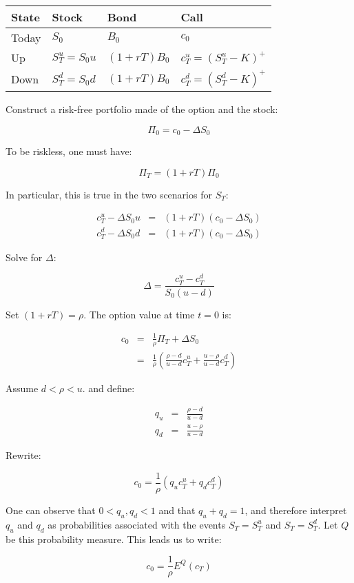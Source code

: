 \documentclass[justified]{tufte-book}
\begin{document}
\begin{longtable}[]{@{}llll@{}}
\toprule
State & Stock & Bond & Call\tabularnewline
\midrule
\endhead
Today & \(S_0\) & \(B_0\) & \(c_0\)\tabularnewline
Up & \(S_T^u = S_0u\) & \((1+rT)B_0\) & \(c_T^u = (S_T^u - K)^+\)\tabularnewline
Down & \(S_T^d = S_0d\) & \((1+rT)B_0\) & \(c_T^d = (S_T^d - K)^+\)\tabularnewline
\bottomrule
\end{longtable}

Construct a risk-free portfolio made of the option and the stock:

\[\Pi_0 = c_0 - \Delta S_0\]

To be riskless, one must have:

\[\Pi_T = (1+rT) \Pi_0\]

In particular, this is true in the two scenarios for \(S_T\):

\[\begin{aligned}
    c_T^u - \Delta S_0u & = & (1+rT)(c_0 - \Delta S_0) \\
    c_T^d - \Delta S_0d & = & (1+rT)(c_0 - \Delta S_0)\end{aligned}\]

Solve for \(\Delta\):

\[\Delta = \frac{c_T^u-c_T^d}{S_0(u-d)}\]

Set \((1+rT) = \rho\). The option value at time \(t=0\) is:

\[\begin{aligned}
    c_0 &=& \frac{1}{\rho} \Pi_T + \Delta S_0 \\
    &=& \frac{1}{\rho} \left( \frac{\rho-d}{u-d} c_T^u + \frac{u-\rho}{u-d} c_T^d \right)\end{aligned}\]

Assume \(d<\rho<u\). and define:

\[\begin{aligned}
    q_u &=& \frac{\rho-d}{u-d} \\
    q_d &=& \frac{u-\rho}{u-d}\end{aligned}\]

Rewrite:

\[c_0 = \frac{1}{\rho} \left(q_u c_T^u + q_d c_T^d \right)
\label{eq:cox-ross-1}\]

One can observe that \(0<q_u, q_d<1\) and that \(q_u+q_d=1\), and therefore
interpret \(q_u\) and \(q_d\) as probabilities associated with the events
\({S_T=S_T^u}\) and \({S_T=S_T^d}\). Let \(Q\) be this probability measure.
This leads us to write:

\[c_0 = \frac{1}{\rho} E^Q(c_T)\]
\end{document}
